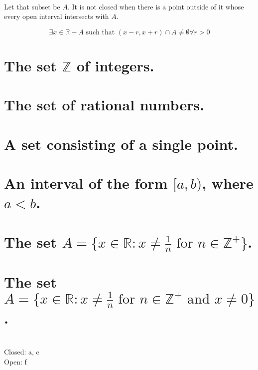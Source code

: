 \begin{solution}
 \\Let that subset be $A$. It is not closed when there is a point outside of it whose every open interval intersects with $A$.
 
 $$\exists x \in \mathbb{R} - A \text{ such that } (x-r,x+r) \cap A \neq \emptyset \forall r > 0$$
\end{solution}


\begin{parts}
 
 \part{The set $\mathbb{Z}$ of integers.}
 \part{The set of rational numbers.}
 \part{A set consisting of a single point.}
 \part{An interval of the form $[a,b)$, where $a < b$.}
 \part{The set $A = \{x\in\mathbb{R}: x \neq \frac{1}{n} \text{ for } n \in \mathbb{Z}^+\}$.}
 \part{The set $A = \{x\in\mathbb{R}: x \neq \frac{1}{n} \text{ for } n \in \mathbb{Z}^+ \text{ and } x \neq 0\}$.}
 
 
\begin{solution}
 \\Closed: a, c \\
 Open: f
\end{solution}

\end{parts}


